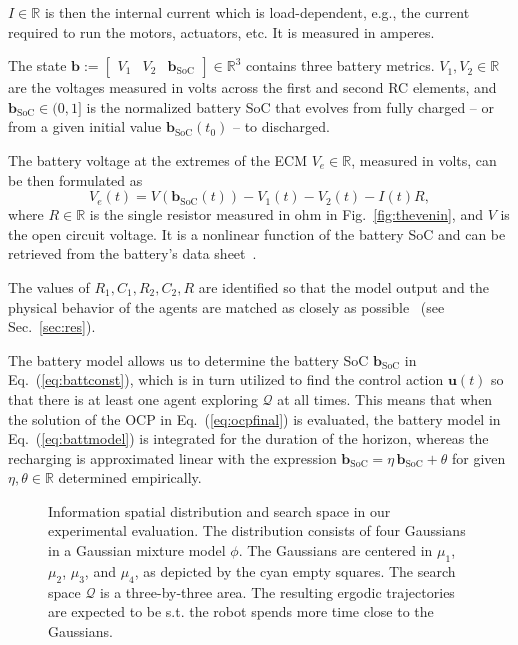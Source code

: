 \documentclass[letterpaper,10pt,conference,twoside]{IEEEtran}
\theoremstyle{definition}
\begin{document}
$I\in\mathbb{R}$ is then the internal current which is load-dependent, e.g., the current required to run the motors, actuators, etc. It is measured in amperes.

The state $\mathbf{b}:=\begin{bmatrix}V_1&V_2&\mathbf{b}_{\text{SoC}}\end{bmatrix}\in\mathbb{R}^3$ contains three battery metrics. $V_1,V_2\in\mathbb{R}$ are the voltages measured in volts across the first and second RC elements, and $\mathbf{b}_{\text{SoC}}\in(0,1]$ is the normalized battery SoC that evolves from fully charged -- or from a given initial value $\mathbf{b}_{\text{SoC}}(t_0)$ -- to discharged.

The battery voltage at the extremes of the ECM $V_e\in\mathbb{R}$, measured in volts, can be then formulated as%
\begin{equation}
  V_e(t)=V(\mathbf{b}_{\text{SoC}}(t))-V_1(t)-V_2(t)-I(t)R,
\end{equation}
where $R\in\mathbb{R}$ is the single resistor measured in ohm in Fig.~\ref{fig:thevenin}, and $V$ is the open circuit voltage. It is a nonlinear function of the battery SoC and can be retrieved from the battery's data sheet~\cite{hinz2019comparison}.

The values of $R_1,C_1,R_2,C_2,R$ are identified so that the model output and the physical behavior of the agents are matched as closely as possible~\cite{zhao2017observability} (see Sec.~\ref{sec:res}).

The battery model allows us to determine the battery SoC $\mathbf{b}_{\text{SoC}}$ in Eq.~(\ref{eq:battconst}), which is in turn utilized to find the control action $\mathbf{u}(t)$ so that there is at least one agent exploring $\mathcal{Q}$ at all times. This means that when the solution of the OCP in Eq.~(\ref{eq:ocpfinal}) is evaluated, the battery model in Eq.~(\ref{eq:battmodel}) is integrated for the duration of the horizon, whereas the recharging is approximated linear with the expression $\mathbf{b}_{\text{SoC}}=\eta\,\mathbf{b}_{\text{SoC}}+\theta$ for given $\eta,\theta\in\mathbb{R}$ determined empirically.

\begin{figure}[t!]
  \begin{minipage}[t!]{.5\columnwidth}
    \vspace*{-.2cm}
    
  \end{minipage}
  \begin{minipage}[c]{.48\columnwidth}
    \vspace*{.05cm}
    \caption{Information spatial distribution and search space in our experimental evaluation. The distribution consists of four Gaussians in a Gaussian mixture model $\phi$. The Gaussians are centered in $\mu_1$, $\mu_2$, $\mu_3$, and $\mu_4$, as depicted by the cyan empty squares. The search space $\mathcal{Q}$ is a three-by-three area. The resulting ergodic trajectories are expected to be s.t. the robot spends more time close to the Gaussians.}
    \label{fig:scenario}
  \end{minipage}
  \vspace*{-.1cm}
\end{figure}
\end{document}
